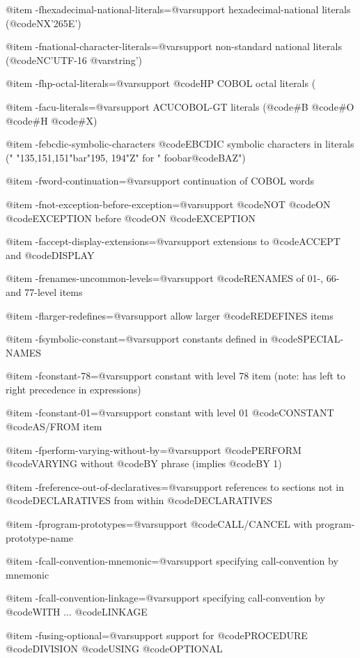 @item -fhexadecimal-national-literals=@var{support}
hexadecimal-national literals (@code{NX'265E'})

@item -fnational-character-literals=@var{support}
non-standard national literals (@code{NC'UTF-16 @var{string}'})

@item -fhp-octal-literals=@var{support}
@code{HP} COBOL octal literals (%

@item -facu-literals=@var{support}
ACUCOBOL-GT literals (@code{#B} @code{#O} @code{#H} @code{#X})

@item -febcdic-symbolic-characters
@code{EBCDIC} symbolic characters in literals (" "135,151,151"bar"195, 194"Z" for " foobar@code{BAZ}")

@item -fword-continuation=@var{support}
continuation of COBOL words

@item -fnot-exception-before-exception=@var{support}
@code{NOT} @code{ON} @code{EXCEPTION} before @code{ON} @code{EXCEPTION}

@item -faccept-display-extensions=@var{support}
extensions to @code{ACCEPT} and @code{DISPLAY}

@item -frenames-uncommon-levels=@var{support}
@code{RENAMES} of 01-, 66- and 77-level items

@item -flarger-redefines=@var{support}
allow larger @code{REDEFINES} items

@item -fsymbolic-constant=@var{support}
constants defined in @code{SPECIAL-NAMES}

@item -fconstant-78=@var{support}
constant with level 78 item (note: has left to right precedence in expressions)

@item -fconstant-01=@var{support}
constant with level 01 @code{CONSTANT} @code{AS/FROM} item

@item -fperform-varying-without-by=@var{support}
@code{PERFORM} @code{VARYING} without @code{BY} phrase (implies @code{BY 1})

@item -freference-out-of-declaratives=@var{support}
references to sections not in @code{DECLARATIVES} from within @code{DECLARATIVES}

@item -fprogram-prototypes=@var{support}
@code{CALL/CANCEL} with program-prototype-name

@item -fcall-convention-mnemonic=@var{support}
specifying call-convention by mnemonic

@item -fcall-convention-linkage=@var{support}
specifying call-convention by @code{WITH} ... @code{LINKAGE}

@item -fusing-optional=@var{support}
support for @code{PROCEDURE} @code{DIVISION} @code{USING} @code{OPTIONAL}

